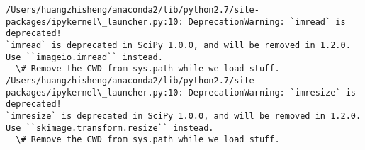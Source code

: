 \documentclass[11pt]{article}
\begin{document}
    \begin{Verbatim}[commandchars=\\\{\}]
/Users/huangzhisheng/anaconda2/lib/python2.7/site-packages/ipykernel\_launcher.py:10: DeprecationWarning: `imread` is deprecated!
`imread` is deprecated in SciPy 1.0.0, and will be removed in 1.2.0.
Use ``imageio.imread`` instead.
  \# Remove the CWD from sys.path while we load stuff.
/Users/huangzhisheng/anaconda2/lib/python2.7/site-packages/ipykernel\_launcher.py:10: DeprecationWarning: `imresize` is deprecated!
`imresize` is deprecated in SciPy 1.0.0, and will be removed in 1.2.0.
Use ``skimage.transform.resize`` instead.
  \# Remove the CWD from sys.path while we load stuff.

    \end{Verbatim}

    \begin{center}
    \end{center}
    { \hspace*{\fill} \\}
    
\end{document}
